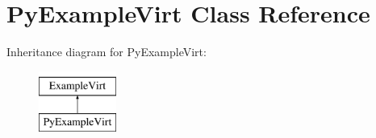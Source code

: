 \hypertarget{class_py_example_virt}{}\section{Py\+Example\+Virt Class Reference}
\label{class_py_example_virt}
Inheritance diagram for Py\+Example\+Virt\+:\begin{figure}[H]
\begin{center}
\leavevmode
\includegraphics[height=2.000000cm]{class_py_example_virt}
\end{center}
\end{figure}
